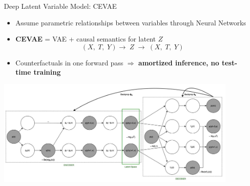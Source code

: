 \documentclass[10pt]{beamer}
\begin{document}
  \begin{frame}{Deep Latent Variable Model: CEVAE}
     \begin{itemize}
         \item Assume parametric relationships between variables through \alert{Neural Networks}
         
         \item \textbf{CEVAE} = VAE + causal semantics for latent \(Z\)  
            \[
              (X,\;T,\;Y)\longrightarrow\;Z \;\longrightarrow\; (X,\;T,\;Y)
            \]
      \item Counterfactuals in one forward pass  \(\Rightarrow\) \textbf{amortized inference, no test-time training}
     \end{itemize}
    \begin{center}
  \includegraphics[width=0.9\textwidth]{images/cevae_architecture.jpeg}
\end{center}

 \end{frame}
\end{document}
